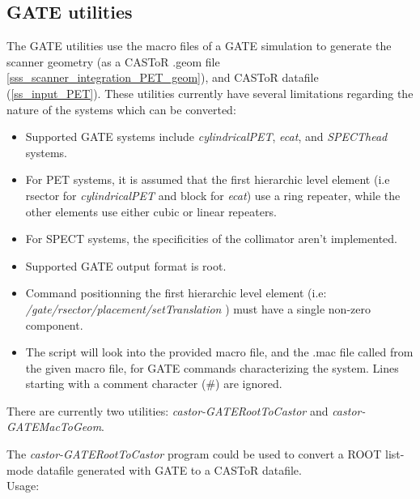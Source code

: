 \documentclass[a4paper, 11pt]{article}
\begin{document}
\subsection{GATE utilities}
\label{ss_utilities_gate}

The GATE utilities use the macro files of a GATE simulation to generate the scanner geometry (as a CASToR .geom file \ref{sss_scanner_integration_PET_geom}),
and CASToR datafile (\ref{ss_input_PET}). These utilities currently have several limitations regarding the nature of the systems which can be converted:

\begin{itemize}
\item Supported GATE systems include \textit{cylindricalPET}, \textit{ecat}, and \textit{SPECThead} systems.
\item For PET systems, it is assumed that the first hierarchic level element (i.e rsector for \textit{cylindricalPET} and block for \textit{ecat}) use a ring repeater, while the other elements use either cubic or linear repeaters.
\item For SPECT systems, the specificities of the collimator aren't implemented.
\item Supported GATE output format is root.
\item Command positionning the first hierarchic level element (i.e: \textit{/gate/rsector/placement/setTranslation} ) must have a single non-zero component.
\item The script will look into the provided macro file, and the .mac file called from the given macro file, for GATE commands characterizing the system.
      Lines starting with a comment character ($\#$) are ignored.
\end{itemize}

There are currently two utilities: \textit{castor-GATERootToCastor} and \textit{castor-GATEMacToGeom}.

The \textit{castor-GATERootToCastor} program could be used to convert a ROOT list-mode datafile generated with GATE\cite{GATE} to a CASToR datafile.\\

Usage:\\
\end{document}
